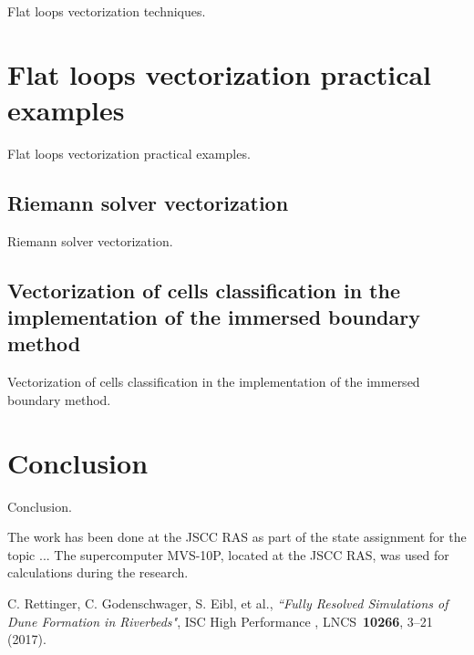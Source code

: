 \documentclass[
11pt,%
tightenlines,%
twoside,%
onecolumn,%
nofloats,%
nobibnotes,%
nofootinbib,%
superscriptaddress,%
noshowpacs,%
centertags]%
{revtex4}
\begin{document}
Flat loops vectorization techniques.

\section{Flat loops vectorization practical examples}

Flat loops vectorization practical examples.

\subsection{Riemann solver vectorization}

Riemann solver vectorization.

\subsection{Vectorization of cells classification in the implementation of the immersed boundary method}

Vectorization of cells classification in the implementation of the immersed boundary method.

\section{Conclusion}

Conclusion.

\begin{acknowledgments}
The work has been done at the JSCC RAS as part of the state assignment for the topic ... The supercomputer MVS-10P, located at the JSCC RAS, was used for calculations during the research.
\end{acknowledgments}

\begin{thebibliography}{99}

C. Rettinger, C. Godenschwager, S. Eibl, et al., {\it ``Fully Resolved Simulations of Dune Formation in Riverbeds"}, ISC High Performance , LNCS~{\bf 10266}, 3--21 (2017).

\end{thebibliography}
\end{document}
